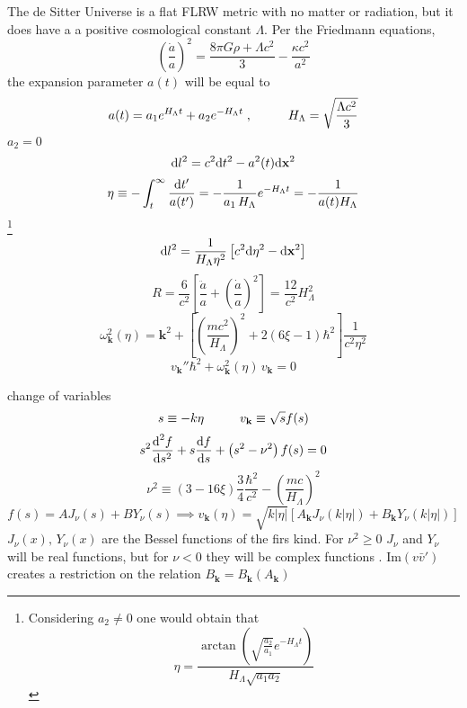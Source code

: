 The de Sitter Universe is a flat FLRW metric with no matter or radiation, but it does have a a positive cosmological constant $\Lambda$. Per the Friedmann equations,
\begin{equation}
	\left(\frac{\dot{a}}{a}\right)^2=\frac{8\pi G\rho+\Lambda c^2}{3}-\frac{\kappa c^2}{a^2}
\end{equation}
the expansion parameter $a(t)$ will be equal to
\begin{equation}
	a(t)=a_1e^{H_\Lambda t}+a_2e^{-H_\Lambda t}\;,\hspace{1.0cm} H_\Lambda=\sqrt{\frac{\Lambda c^2}{3}}
\end{equation}
$a_2=0$
\begin{equation}
	\text{d} l^2=c^2\text{d} t^2-a^2(t)\text{d}\mathbf{x}^2
\end{equation}
\begin{equation}
	\eta\equiv -\int_t^\infty\frac{\text{d} t'}{a(t')}=-\frac{1}{a_1\,H_\Lambda}e^{-H_\Lambda t}=-\frac{1}{a(t)H_\Lambda}
\end{equation}
\footnote{Considering $a_2\not=0$ one would obtain that
$$\eta=\frac{\arctan\left(\sqrt{\frac{a_2}{a_1}}e^{-H_\Lambda t}\right)}{H_\Lambda\sqrt{a_1a_2}}$$}
\begin{equation}
	\text{d} l^2= \frac{1}{H_\Lambda\eta^2}\left[c^2\text{d}\eta^2-\text{d} \mathbf{x}^2\right]
\end{equation}
\begin{equation}
	R=\frac{6}{c^2}\left[\frac{\ddot{a}}{a}+\left(\frac{\dot{a}}{a}\right)^2\right]=\frac{12}{c^2}H_\Lambda^2
\end{equation}
\begin{equation}
	\omega^2_\mathbf{k}(\eta)=\mathbf{k}^2+\left[\left(\frac{mc^2}{H_\Lambda}\right)^2+2\left(6\xi-1\right)\hbar^2\right]\frac{1}{c^2\eta^2}
\end{equation}
\begin{equation}
	v_\mathbf{k}''\hbar^2+\omega^2_\mathbf{k}(\eta)\,v_\mathbf{k}=0
\end{equation}

change of variables
\begin{equation}
	s\equiv -k\eta\hspace{1.0cm}v_\mathbf{k}\equiv \sqrt{s}f(s)
\end{equation}
\begin{equation}
	s^2\frac{\text{d}^2f}{\text{d} s^2}+s\frac{\text{d} f}{\text{d} s}+\left(s^2-\nu^2\right)f(s)=0
\end{equation}
\begin{equation}
	\nu^2\equiv \left(3-16\xi\right)\frac{3}{4}\frac{\hbar^2}{c^2}-\left(\frac{mc}{H_\Lambda}\right)^2
\end{equation}
\begin{equation}
	f(s)=AJ_\nu(s)+BY_\nu(s)\implies v_\mathbf{k}(\eta)=\sqrt{k|\eta|}\left[A_\mathbf{k}J_\nu(k|\eta|)+B_\mathbf{k}Y_\nu(k|\eta|)\right]
\end{equation}
$J_\nu(x),\,Y_\nu(x)$ are the Bessel functions of the firs kind. For $\nu^2\geq 0$ $J_\nu$ and $Y_\nu$ will be real functions, but for $\nu<0$ they will be complex functions \cite{BesselComplex}. $\text{Im}(v\bar v')$ creates a restriction on the relation $B_\mathbf{k}=B_\mathbf{k}(A_\mathbf{k})$